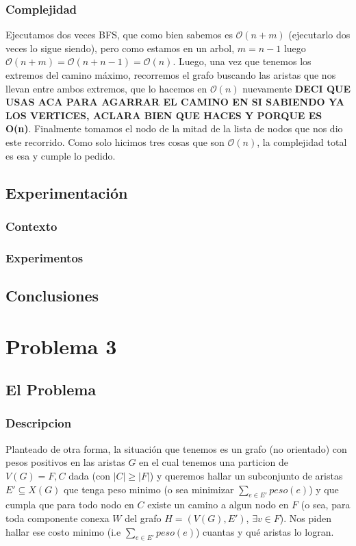 \documentclass[A4paper,oneside,fleqn,11pt]{article}
\theoremstyle{definition}
\begin{document}
\subsubsection{Complejidad}

Ejecutamos dos veces BFS, que como bien sabemos es $\mathcal{O} (n+m)$ (ejecutarlo dos veces lo sigue siendo), pero como estamos en un arbol, $m=n-1$ luego $\mathcal{O} (n+m) =\mathcal{O} (n+n-1)=\mathcal{O} (n)$. Luego, una vez que tenemos los extremos del camino máximo, recorremos el grafo buscando las aristas que nos llevan entre ambos extremos, que lo hacemos en $\mathcal{O} (n)$ nuevamente \textbf{DECI QUE USAS ACA PARA AGARRAR EL CAMINO EN SI SABIENDO YA LOS VERTICES, ACLARA BIEN QUE HACES Y PORQUE ES O(n)}. Finalmente tomamos el nodo de la mitad de la lista de nodos que nos dio este recorrido. Como solo hicimos tres cosas que son $\mathcal{O} (n)$, la complejidad total es esa y cumple lo pedido.

\subsection{Experimentación}

\subsubsection{Contexto}

\subsubsection{Experimentos}


\subsection{Conclusiones}




\section{Problema 3}

\subsection{El Problema}

\subsubsection{Descripcion}
Planteado de otra forma, la situación que tenemos es un grafo (no orientado) con pesos positivos en las aristas $G$ en el cual tenemos una particion de $V(G)={F,C}$ dada  (con $|C| \geq |F|$) y queremos hallar un subconjunto de aristas $E' \subseteq X(G)$ que tenga peso minimo (o sea minimizar $\sum\limits_{e \in E'} {peso(e)}$) y que cumpla que para todo nodo en $C$ existe un camino a algun nodo en $F$ (o sea, para toda componente conexa $W$ del  grafo $H=(V(G),E')$,  $\exists v \in F$). Nos piden hallar ese costo minimo (i.e $\sum\limits_{e \in E'} {peso(e)}$) cuantas y qué aristas lo logran.
\end{document}
